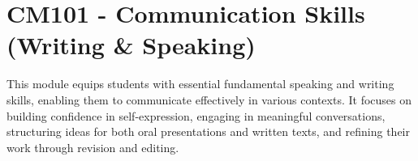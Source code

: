 
\section{CM101 - Communication Skills (Writing \& Speaking)}
\addtocounter{section}{2} %

\begin{tcolorbox}[boxstyle, title={Module Overview}]
    This module equips students with essential fundamental speaking and writing skills, enabling them to communicate effectively in various contexts. It focuses on building confidence in self-expression, engaging in meaningful conversations, structuring ideas for both oral presentations and written texts, and refining their work through revision and editing.
\end{tcolorbox}

